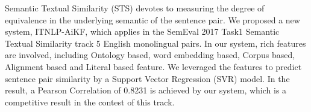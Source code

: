 Semantic Textual Similarity (STS) devotes to measuring the degree of equivalence in the underlying semantic of the sentence pair. We proposed a new system, ITNLP-AiKF, which applies in the SemEval 2017 Task1 Semantic Textual Similarity track 5 English monolingual pairs. In our system, rich features are involved, including Ontology based, word embedding based, Corpus based, Alignment based and Literal based feature. We leveraged the features to predict sentence pair similarity by a Support Vector Regression (SVR) model. In the result, a Pearson Correlation of 0.8231 is achieved by our system, which is a competitive result in the contest of this track.
